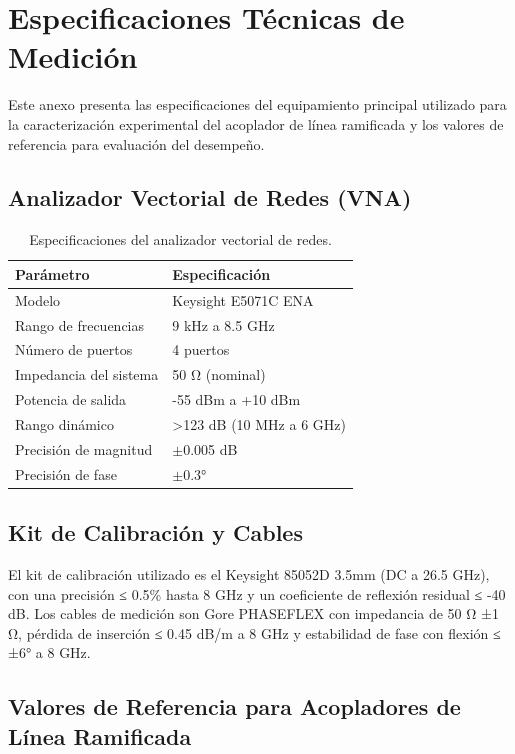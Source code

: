 \chapter{Especificaciones Técnicas de Medición}

Este anexo presenta las especificaciones del equipamiento principal utilizado para la caracterización experimental del acoplador de línea ramificada y los valores de referencia para evaluación del desempeño.

\section{Analizador Vectorial de Redes (VNA)}

\begin{table}[h]
\centering
\begin{tabular}{|l|l|}
\hline
\textbf{Parámetro} & \textbf{Especificación} \\
\hline
Modelo & Keysight E5071C ENA \\
Rango de frecuencias & 9 kHz a 8.5 GHz \\
Número de puertos & 4 puertos \\
Impedancia del sistema & 50 Ω (nominal) \\
Potencia de salida & -55 dBm a +10 dBm \\
Rango dinámico & >123 dB (10 MHz a 6 GHz) \\
Precisión de magnitud & $\pm$0.005 dB \\
Precisión de fase & $\pm$0.3° \\
\hline
\end{tabular}
\caption{Especificaciones del analizador vectorial de redes.}
\end{table}

\section{Kit de Calibración y Cables}

El kit de calibración utilizado es el Keysight 85052D 3.5mm (DC a 26.5 GHz), con una precisión ≤ 0.5\% hasta 8 GHz y un coeficiente de reflexión residual ≤ -40 dB. Los cables de medición son Gore PHASEFLEX con impedancia de 50 Ω ±1 Ω, pérdida de inserción ≤ 0.45 dB/m a 8 GHz y estabilidad de fase con flexión ≤ ±6° a 8 GHz.

\section{Valores de Referencia para Acopladores de Línea Ramificada}

